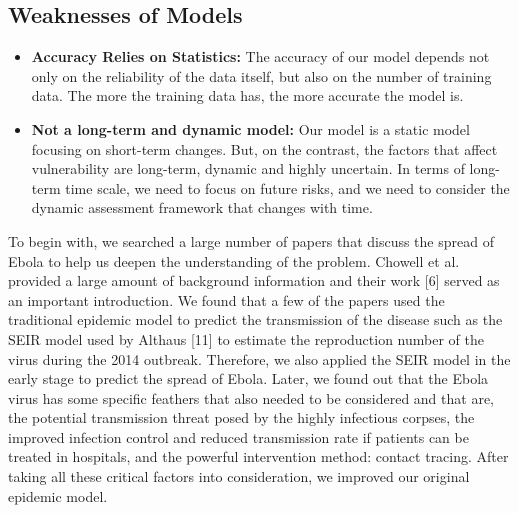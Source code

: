 \documentclass{mcmthesis}
\begin{document}
\subsection{Weaknesses of Models}
\begin{itemize}
  \item \textbf{Accuracy Relies on Statistics:} The accuracy of our model 
  depends not only on the reliability of the data itself, but also on the 
  number of training data. The more the training data has, 
  the more accurate the model is.
  \item \textbf{Not a long-term and dynamic model:} Our model is a static 
  model focusing on short-term changes. But, on the contrast, the factors 
  that affect vulnerability are long-term, dynamic and highly uncertain. 
  In terms of long-term time scale, we need to focus on future risks, and 
  we need to consider the dynamic assessment framework that changes with time. 
\end{itemize}



To begin with, we searched a large number of papers that discuss the spread of
Ebola to help us deepen the understanding of the problem. Chowell et al. provided a
large amount of background information and their work [6] served as an important
introduction. We found that a few of the papers used the traditional epidemic model to
predict the transmission of the disease such as the SEIR model used by Althaus [11] to
estimate the reproduction number of the virus\cite{bib1,bib2} during the 2014 outbreak. Therefore, we
also applied the SEIR model in the early stage to predict the spread of Ebola. Later, we
found out that the Ebola virus has some specific feathers that also needed to be
considered and that are, the potential transmission threat posed by the highly infectious
corpses, the improved infection control and reduced transmission rate if patients can be
treated in hospitals, and the powerful intervention method: contact tracing. After taking
all these critical factors into consideration, we improved our original epidemic model.
\end{document}
